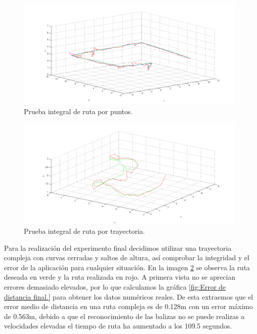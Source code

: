 \begin{figure}[H]
	\begin{center}
		\includegraphics[width=1\textwidth]{imag/IMG42.png}
				\caption{Prueba integral de ruta por puntos.}
		\label{fig:Prueba integral de ruta por puntos.}	
	\end{center}
\end{figure}

\begin{figure}[H]
	\begin{center}
		\includegraphics[width=1\textwidth]{imag/IMG43.png}
				\caption{Prueba integral de ruta por trayectoria.}
		\label{fig:Prueba integral de ruta por trayectoria.}	
	\end{center}
\end{figure}

\hspace{1cm} Para la realización del experimento final decidimos utilizar una trayectoria compleja con curvas cerradas y saltos de altura, así comprobar la integridad y el error de la aplicación para cualquier situación. En la imagen \ref{fig:Prueba integral de ruta por trayectoria.} se observa la ruta deseada en verde y la ruta realizada en rojo. A primera vista no se aprecian errores demasiado elevados, por lo que calculamos la gráfica \ref{fig:Error de distancia final.} para obtener los datos numéricos reales. De esta extraemos que el error medio de distancia en una ruta compleja es de 0.128m con un error máximo de 0.563m, debido a que el reconocimiento de las balizas no se puede realizas a velocidades elevadas el tiempo de ruta ha aumentado a los 109.5 segundos.

